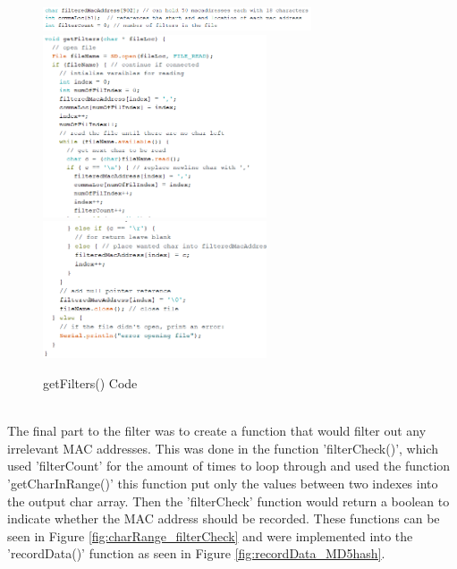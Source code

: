 \documentclass{report}
\begin{document}
\begin{figure}[h!]
    \centering
    \includegraphics[width=300]{getFilters_3.PNG} 
    \includegraphics[width=250]{getFilters_1.PNG}
    \includegraphics[width=250]{getFilters_2.PNG} 
    \caption{getFilters() Code}
    \label{fig:wifigetFilters}
\end{figure} \\
The final part to the filter was to create a function that would filter out any irrelevant MAC addresses. This was done in the function 'filterCheck()', which used 'filterCount' for the amount of times to loop through and used the function 'getCharInRange()' this function put only the values between two indexes into the output char array. Then the 'filterCheck' function would return a boolean to indicate whether the MAC address should be recorded. These functions can be seen in Figure \ref{fig:charRange_filterCheck} and were implemented into the 'recordData()' function as seen in Figure \ref{fig:recordData_MD5hash}. \\ \newline
\end{document}
